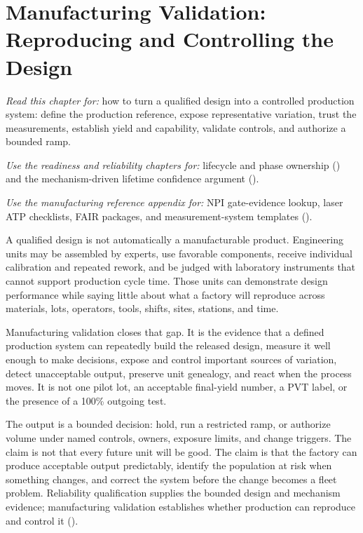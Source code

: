\chapter{Manufacturing Validation: Reproducing and Controlling the Design}
\label{ch:manufacturing}

\textit{Read this chapter for:} how to turn a qualified design into a controlled
production system: define the production reference, expose representative
variation, trust the measurements, establish yield and capability, validate
controls, and authorize a bounded ramp.

\textit{Use the readiness and reliability chapters for:} lifecycle and phase
ownership () and the mechanism-driven
lifetime confidence argument ().

\textit{Use the manufacturing reference appendix for:} NPI gate-evidence
lookup, laser ATP checklists, FAIR packages, and measurement-system templates
().

A qualified design is not automatically a manufacturable product. Engineering
units may be assembled by experts, use favorable components, receive individual
calibration and repeated rework, and be judged with laboratory instruments that
cannot support production cycle time. Those units can demonstrate design
performance while saying little about what a factory will reproduce across
materials, lots, operators, tools, shifts, sites, stations, and time.

Manufacturing validation closes that gap. It is the evidence that a defined
production system can repeatedly build the released design, measure it well
enough to make decisions, expose and control important sources of variation,
detect unacceptable output, preserve unit genealogy, and react when the process
moves. It is not one pilot lot, an acceptable final-yield number, a PVT label,
or the presence of a 100\% outgoing test.

The output is a bounded decision: hold, run a restricted ramp, or authorize
volume under named controls, owners, exposure limits, and change triggers. The
claim is not that every future unit will be good. The claim is that the factory
can produce acceptable output predictably, identify the population at risk when
something changes, and correct the system before the change becomes a fleet
problem. Reliability qualification supplies the bounded design and
mechanism evidence; manufacturing validation establishes whether production can
reproduce and control it ().


